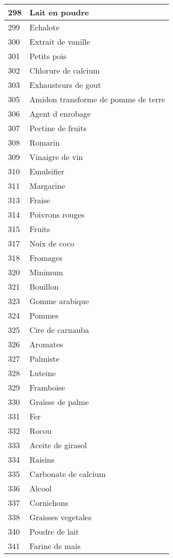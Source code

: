 \begin{longtable}{|l|l|}
298 & Lait en poudre \\ \hline 
299 & Echalote \\ \hline 
300 & Extrait de vanille \\ \hline 
301 & Petits pois \\ \hline 
302 & Chlorure de calcium \\ \hline 
303 & Exhausteurs de gout \\ \hline 
305 & Amidon transforme de pomme de terre \\ \hline 
306 & Agent d enrobage \\ \hline 
307 & Pectine de fruits \\ \hline 
308 & Romarin \\ \hline 
309 & Vinaigre de vin \\ \hline 
310 & Emulsifier \\ \hline 
311 & Margarine \\ \hline 
313 & Fraise \\ \hline 
314 & Poivrons rouges \\ \hline 
315 & Fruits \\ \hline 
317 & Noix de coco \\ \hline 
318 & Fromages \\ \hline 
320 & Minimum \\ \hline 
321 & Bouillon \\ \hline 
323 & Gomme arabique \\ \hline 
324 & Pommes \\ \hline 
325 & Cire de carnauba \\ \hline 
326 & Aromates \\ \hline 
327 & Palmiste \\ \hline 
328 & Luteine \\ \hline 
329 & Framboise \\ \hline 
330 & Graisse de palme \\ \hline 
331 & Fer \\ \hline 
332 & Rocou \\ \hline 
333 & Aceite de girasol \\ \hline 
334 & Raisins \\ \hline 
335 & Carbonate de calcium \\ \hline 
336 & Alcool \\ \hline 
337 & Cornichons \\ \hline 
338 & Graisses vegetales \\ \hline 
340 & Poudre de lait \\ \hline 
341 & Farine de mais \\ \hline 

\end{longtable}

